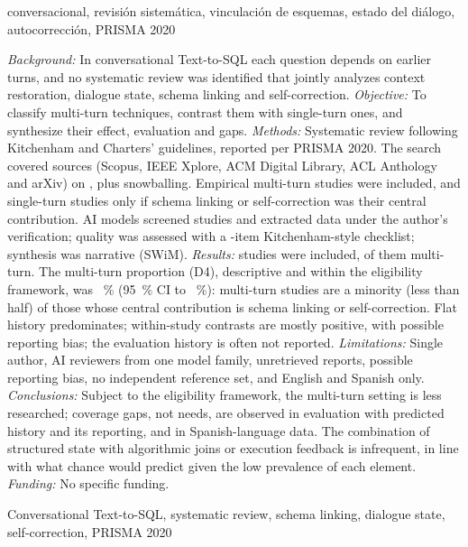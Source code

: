 \begin{IEEEkeywords}
 conversacional, revisión sistemática, vinculación de esquemas, estado del diálogo, autocorrección, PRISMA 2020
\end{IEEEkeywords}

\begin{abstracten}
\textit{Background:} In conversational Text-to-SQL each question depends on earlier turns, and no systematic review was identified that jointly analyzes context restoration, dialogue state, schema linking and self-correction.
\textit{Objective:} To classify multi-turn techniques, contrast them with single-turn ones, and synthesize their effect, evaluation and gaps.
\textit{Methods:} Systematic review following Kitchenham and Charters' guidelines, reported per PRISMA 2020. The search covered \nBases{} sources (Scopus, IEEE Xplore, ACM Digital Library, ACL Anthology and arXiv) on \fechaBusqueda{}, plus snowballing. Empirical multi-turn studies were included, and single-turn studies only if schema linking or self-correction was their central contribution. AI models screened studies and extracted data under the author's verification; quality was assessed with a \nItemsCalidad{}-item Kitchenham-style checklist; synthesis was narrative (SWiM).
\textit{Results:} \nEstudios{} studies were included, \nMultiturno{} of them multi-turn. The multi-turn proportion (D4), descriptive and within the eligibility framework, was \DcuatroPct~\% (95~\% CI \DcuatroICinf{} to \DcuatroICsup~\%): multi-turn studies are a minority (less than half) of those whose central contribution is schema linking or self-correction. Flat history predominates; within-study contrasts are mostly positive, with possible reporting bias; the evaluation history is often not reported.
\textit{Limitations:} Single author, AI reviewers from one model family, unretrieved reports, possible reporting bias, no independent reference set, and English and Spanish only.
\textit{Conclusions:} Subject to the eligibility framework, the multi-turn setting is less researched; coverage gaps, not needs, are observed in evaluation with predicted history and its reporting, and in Spanish-language data. The combination of structured state with algorithmic joins or execution feedback is infrequent, in line with what chance would predict given the low prevalence of each element.
\textit{Funding:} No specific funding.
\end{abstracten}

\begin{keywordsen}
Conversational Text-to-SQL, systematic review, schema linking, dialogue state, self-correction, PRISMA 2020
\end{keywordsen}
